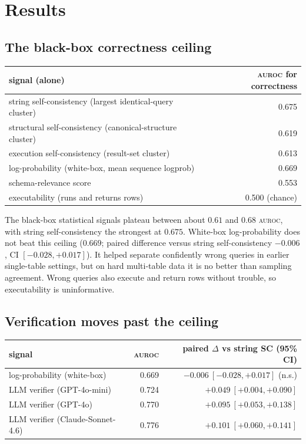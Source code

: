 \documentclass[11pt]{article}
\newcommand{\auroc}{\textsc{auroc}}
\begin{document}
\section{Results}

\subsection{The black-box correctness ceiling}
\label{sec:ceiling}
\begin{table}[h]\centering
\begin{tabular}{lr}
\toprule
signal (alone) & \auroc{} for correctness \\
\midrule
string self-consistency (largest identical-query cluster) & 0.675 \\
structural self-consistency (canonical-structure cluster) & 0.619 \\
execution self-consistency (result-set cluster) & 0.613 \\
log-probability (white-box, mean sequence logprob) & 0.669 \\
schema-relevance score & 0.553 \\
executability (runs and returns rows) & 0.500 (chance) \\
\bottomrule
\end{tabular}
\end{table}

The black-box statistical signals plateau between about $0.61$ and $0.68$ \auroc{}, with string
self-consistency the strongest at $0.675$. White-box log-probability does not beat this ceiling
($0.669$; paired difference versus string self-consistency $-0.006$, CI $[-0.028, +0.017]$). It
helped separate confidently wrong queries in earlier single-table settings, but on hard multi-table
data it is no better than sampling agreement. Wrong queries also execute and return rows without
trouble, so executability is uninformative.

\subsection{Verification moves past the ceiling}
\label{sec:verify}
\begin{table}[h]\centering
\begin{tabular}{lrr}
\toprule
signal & \auroc{} & paired $\Delta$ vs string SC (95\% CI) \\
\midrule
log-probability (white-box) & 0.669 & $-0.006\ [-0.028, +0.017]$ (n.s.) \\
LLM verifier (GPT-4o-mini) & 0.724 & $+0.049\ [+0.004, +0.090]$ \\
LLM verifier (GPT-4o) & 0.770 & $+0.095\ [+0.053, +0.138]$ \\
LLM verifier (Claude-Sonnet-4.6) & 0.776 & $+0.101\ [+0.060, +0.141]$ \\
\bottomrule
\end{tabular}
\end{table}
\end{document}
